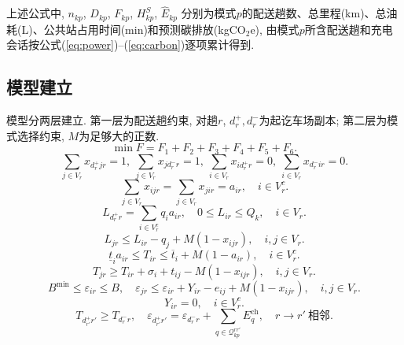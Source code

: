 \documentclass{setp-new}
\begin{document}
上述公式中, $n_{kp}$, $D_{kp}$, $F_{kp}$, $H_{kp}^{S}$, $\widehat E_{kp}$
分别为模式$p$的配送趟数、总里程(km)、总油耗(L)、公共站占用时间(min)和预测碳排放(kgCO$_2$e),
由模式$p$所含配送趟和充电会话按公式(\ref{eq:power})--(\ref{eq:carbon})逐项累计得到.

\subsection{模型建立}

模型分两层建立. 第一层为配送趟约束, 对趟$r$, $d_r^+,d_r^-$为起讫车场副本; 第二层为模式选择约束, $M$为足够大的正数.
\begin{equation}
\min F=F_1+F_2+F_3+F_4+F_5+F_6. \label{eq:obj}
\end{equation}
\begin{equation}
\sum_{j\in V_r}x_{d_r^+jr}=1,\ \sum_{j\in V_r}x_{jd_r^-r}=1,\ \sum_{i\in V_r}x_{id_r^+r}=0,\ \sum_{i\in V_r}x_{d_r^-ir}=0.
\label{eq:trip_flow}
\end{equation}
\begin{equation}
\sum_{j\in V_r}x_{ijr}=\sum_{j\in V_r}x_{jir}=a_{ir},\quad i\in V_r^c.
\label{eq:flow_cons}
\end{equation}
\begin{equation}
L_{d_r^+r}=\sum_{i\in V_r^c}q_i a_{ir},\quad 0\le L_{ir}\le Q_k,\quad i\in V_r.
\label{eq:load_bounds}
\end{equation}
\begin{equation}
L_{jr}\le L_{ir}-q_j+M(1-x_{ijr}),\quad i,j\in V_r.
\label{eq:load_prop}
\end{equation}
\begin{equation}
\underline t_i a_{ir}\le T_{ir}\le\overline t_i+M(1-a_{ir}),\quad i\in V_r^c.
\label{eq:tw}
\end{equation}
\begin{equation}
T_{jr}\ge T_{ir}+\sigma_i+t_{ij}-M(1-x_{ijr}),\quad i,j\in V_r.
\label{eq:time_prop}
\end{equation}
\begin{equation}
B^{\min}\le\varepsilon_{ir}\le B,\quad
\varepsilon_{jr}\le\varepsilon_{ir}+Y_{ir}-e_{ij}+M(1-x_{ijr}),\quad i,j\in V_r.
\label{eq:batt_prop}
\end{equation}
\begin{equation}
Y_{ir}=0,\quad i\in V_r^c.
\label{eq:no_customer_charge}
\end{equation}
\begin{equation}
T_{d_{r'}^+r'}\ge T_{d_r^-r},\quad
\varepsilon_{d_{r'}^+r'}=\varepsilon_{d_r^-r}+\sum_{q\in\mathcal Q_{kp}^{rr'}}E_q^{\mathrm{ch}},\quad r\to r'\ \text{相邻}.
\label{eq:trip_linkage}
\end{equation}
\end{document}
